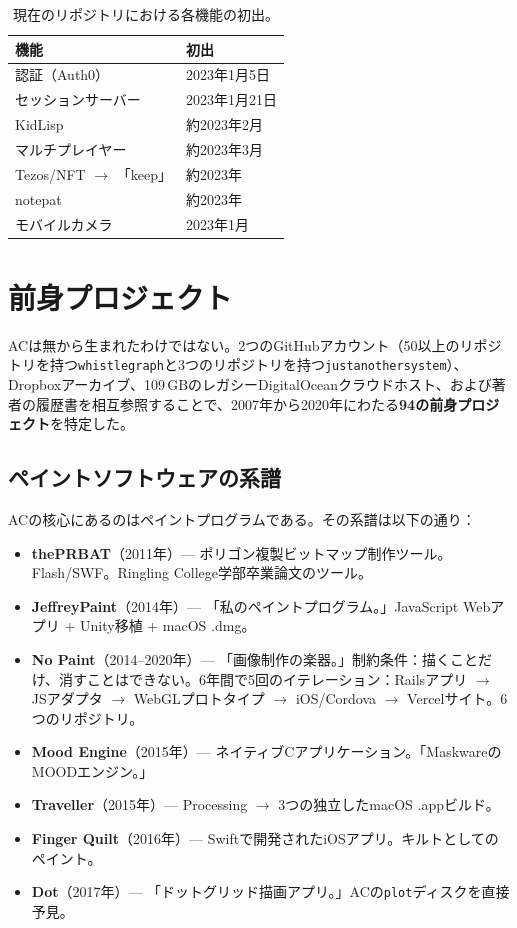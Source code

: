 \documentclass[10pt,letterpaper,twocolumn]{article}
\begin{document}
\begin{table}[h]
\small
\centering
\begin{tabular}{ll}
\toprule
\textbf{機能} & \textbf{初出} \\
\midrule
認証（Auth0） & 2023年1月5日 \\
セッションサーバー & 2023年1月21日 \\
KidLisp & 約2023年2月 \\
マルチプレイヤー & 約2023年3月 \\
Tezos/NFT $\rightarrow$ 「keep」 & 約2023年 \\
notepat & 約2023年 \\
モバイルカメラ & 2023年1月 \\
\bottomrule
\end{tabular}
\caption{現在のリポジトリにおける各機能の初出。}
\end{table}


\section{前身プロジェクト}

ACは無から生まれたわけではない。2つのGitHubアカウント（50以上のリポジトリを持つ\texttt{whistlegraph}と3つのリポジトリを持つ\texttt{justanothersystem}）、Dropboxアーカイブ、109\,GBのレガシーDigitalOceanクラウドホスト、および著者の履歴書を相互参照することで、2007年から2020年にわたる\textbf{94の前身プロジェクト}を特定した。

\subsection{ペイントソフトウェアの系譜}

ACの核心にあるのはペイントプログラムである。その系譜は以下の通り：

\begin{itemize}
  \item \textbf{thePRBAT}（2011年）--- ポリゴン複製ビットマップ制作ツール。Flash/SWF。Ringling College学部卒業論文のツール。
  \item \textbf{JeffreyPaint}（2014年）--- 「私のペイントプログラム。」JavaScript Webアプリ + Unity移植 + macOS .dmg。
  \item \textbf{No Paint}（2014--2020年）--- 「画像制作の楽器。」制約条件：描くことだけ、消すことはできない。6年間で5回のイテレーション：Railsアプリ $\rightarrow$ JSアダプタ $\rightarrow$ WebGLプロトタイプ $\rightarrow$ iOS/Cordova $\rightarrow$ Vercelサイト。6つのリポジトリ。
  \item \textbf{Mood Engine}（2015年）--- ネイティブCアプリケーション。「MaskwareのMOODエンジン。」
  \item \textbf{Traveller}（2015年）--- Processing $\rightarrow$ 3つの独立したmacOS .appビルド。
  \item \textbf{Finger Quilt}（2016年）--- Swiftで開発されたiOSアプリ。キルトとしてのペイント。
  \item \textbf{Dot}（2017年）--- 「ドットグリッド描画アプリ。」ACの\texttt{plot}ディスクを直接予見。
\end{itemize}
\end{document}
